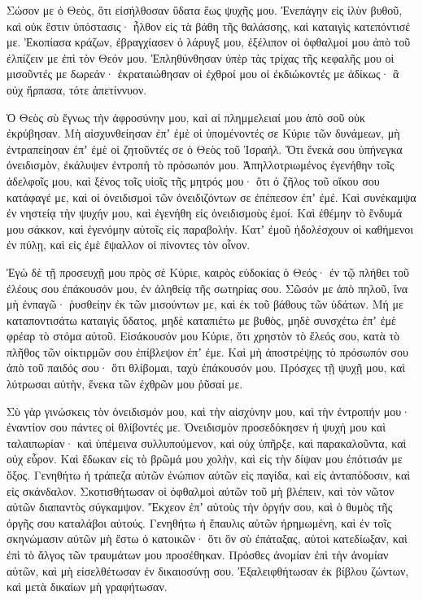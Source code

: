 \begin{spacing}{1.1}
\begin{multicols}{2}
Σώσον με ὁ Θεὸς, ὅτι εἰσήλθοσαν ὕδατα ἕως ψυχῆς μου.
Ἐνεπάγην εἰς ἰλὺν βυθοῦ, καὶ οὐκ ἔστιν ὑπόστασις· ἦλθον εἰς τὰ βάθη τῆς θαλάσσης, καὶ καταιγὶς κατεπόντισέ με.
Ἐκοπίασα κράζων, ἐβραγχίασεν ὁ λάρυγξ μου, ἐξέλιπον οἱ ὀφθαλμοί μου ἀπὸ τοῦ ἐλπίζειν με ἐπὶ τὸν Θεόν μου.
Ἐπληθύνθησαν ὑπὲρ τὰς τρίχας τῆς κεφαλῆς μου οἱ μισοῦντές με δωρεάν· ἐκραταιώθησαν οἱ ἐχθροί μου οἱ ἐκδιώκοντές με ἀδίκως· ἃ οὐχ ἥρπασα, τότε ἀπετίννυον.

Ὁ Θεὸς σὺ ἔγνως τὴν ἀφροσύνην μου, καὶ αἱ πλημμελειαί μου ἀπὸ σοῦ οὐκ ἐκρύβησαν.
Μὴ αἰσχυνθείησαν ἐπʼ ἐμὲ οἱ ὑπομένοντές σε Κύριε τῶν δυνάμεων, μὴ ἐντραπείησαν ἐπʼ ἐμὲ οἱ ζητοῦντές σε ὁ Θεὸς τοῦ Ἰσραήλ.
Ὅτι ἕνεκά σου ὑπήνεγκα ὀνειδισμὸν, ἐκάλυψεν ἐντροπὴ τὸ πρόσωπόν μου.
Ἀπηλλοτριωμένος ἐγενήθην τοῖς ἀδελφοῖς μου, καὶ ξένος τοῖς υἱοῖς τῆς μητρός μου·
ὅτι ὁ ζῆλος τοῦ οἴκου σου κατάφαγέ με, καὶ οἱ ὀνειδισμοὶ τῶν ὀνειδιζόντων σε ἐπέπεσον ἐπʼ ἐμέ.
Καὶ συνέκαμψα ἐν νηστείᾳ τὴν ψυχήν μου, καὶ ἐγενήθη εἰς ὀνειδισμοὺς ἐμοί.
Καὶ ἐθέμην τὸ ἔνδυμά μου σάκκον, καὶ ἐγενόμην αὐτοῖς εἰς παραβολήν.
Κατʼ ἐμοῦ ἠδολέσχουν οἱ καθήμενοι ἐν πύλῃ, καὶ εἰς ἐμὲ ἔψαλλον οἱ πίνοντες τὸν οἶνον.

Ἐγὼ δὲ τῇ προσευχῇ μου πρὸς σὲ Κύριε, καιρὸς εὐδοκίας ὁ Θεός· ἐν τῷ πλήθει τοῦ ἐλέους σου ἐπάκουσόν μου, ἐν ἀληθείᾳ τῆς σωτηρίας σου.
Σῶσόν με ἀπὸ πηλοῦ, ἵνα μὴ ἐνπαγῶ· ῥυσθείην ἐκ τῶν μισούντων με, καὶ ἐκ τοῦ βάθους τῶν ὑδάτων.
Μή με καταποντισάτω καταιγὶς ὕδατος, μηδὲ καταπιέτω με βυθὸς, μηδὲ συνσχέτω ἐπʼ ἐμὲ φρέαρ τὸ στόμα αὐτοῦ.
Εἰσάκουσόν μου Κύριε, ὅτι χρηστὸν τὸ ἔλεός σου, κατὰ τὸ πλῆθος τῶν οἰκτιρμῶν σου ἐπίβλεψον ἐπʼ ἐμε.
Καὶ μὴ ἀποστρέψῃς τὸ πρόσωπόν σου ἀπὸ τοῦ παιδός σου· ὅτι θλίβομαι, ταχὺ ἐπάκουσόν μου.
Πρόσχες τῇ ψυχῇ μου, καὶ λύτρωσαι αὐτὴν, ἕνεκα τῶν ἐχθρῶν μου ῥῦσαί με.

Σὺ γὰρ γινώσκεις τὸν ὀνειδισμόν μου, καὶ τὴν αἰσχύνην μου, καὶ τὴν ἐντροπήν μου· ἐναντίον σου πάντες οἱ θλίβοντές με.
Ὀνειδισμὸν προσεδόκησεν ἡ ψυχή μου καὶ ταλαιπωρίαν· καὶ ὑπέμεινα συλλυπούμενον, καὶ οὐχ ὑπῆρξε, καὶ παρακαλοῦντα, καὶ οὐχ εὗρον.
Καὶ ἔδωκαν εἰς τὸ βρῶμά μου χολὴν, καὶ εἰς τὴν δίψαν μου ἐπότισάν με ὄξος.
Γενηθήτω ἡ τράπεζα αὐτῶν ἐνώπιον αὐτῶν εἰς παγίδα, καὶ εἰς ἀνταπόδοσιν, καὶ εἰς σκάνδαλον.
Σκοτισθήτωσαν οἱ ὀφθαλμοὶ αὐτῶν τοῦ μὴ βλέπειν, καὶ τὸν νῶτον αὐτῶν διαπαντὸς σύγκαμψον.
Ἔκχεον ἐπʼ αὐτοὺς τὴν ὀργήν σου, καὶ ὁ θυμὸς τῆς ὀργῆς σου καταλάβοι αὐτούς.
Γενηθήτω ἡ ἔπαυλις αὐτῶν ἠρημωμένη, καὶ ἐν τοῖς σκηνώμασιν αὐτῶν μὴ ἔστω ὁ κατοικῶν·
ὅτι ὃν σὺ ἐπάταξας, αὐτοὶ κατεδίωξαν, καὶ ἐπὶ τὸ ἄλγος τῶν τραυμάτων μου προσέθηκαν.
Πρόσθες ἀνομίαν ἐπὶ τὴν ἀνομίαν αὐτῶν, καὶ μὴ εἰσελθέτωσαν ἐν δικαιοσύνῃ σου.
Ἐξαλειφθήτωσαν ἐκ βίβλου ζώντων, καὶ μετὰ δικαίων μὴ γραφήτωσαν.


\end{multicols}
\end{spacing}
